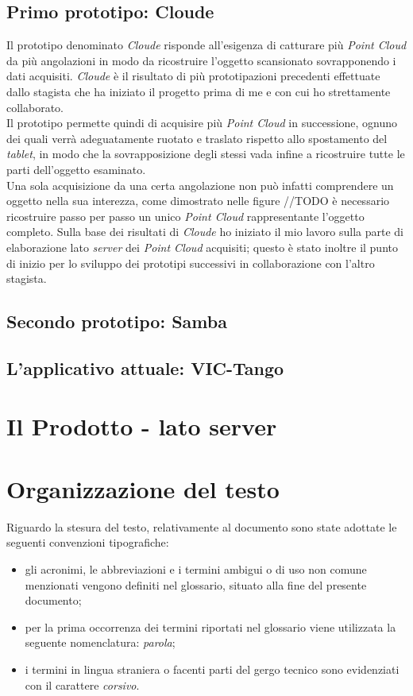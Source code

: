 \subsection{Primo prototipo: Cloude}
Il prototipo denominato \emph{Cloude} risponde all'esigenza di catturare più \emph{Point Cloud} da più angolazioni in modo da ricostruire l'oggetto scansionato sovrapponendo i dati acquisiti. \emph{Cloude} è il risultato di più prototipazioni precedenti effettuate dallo stagista che ha iniziato il progetto prima di me e con cui ho strettamente collaborato.\\
Il prototipo permette quindi di acquisire più \emph{Point Cloud} in successione, ognuno dei quali verrà adeguatamente ruotato e traslato rispetto allo spostamento del \emph{tablet}, in modo che la sovrapposizione degli stessi vada infine a ricostruire tutte le parti dell'oggetto esaminato.\\
Una sola acquisizione da una certa angolazione non può infatti comprendere un oggetto nella sua interezza, come dimostrato nelle figure //TODO è necessario ricostruire passo per passo un unico \emph{Point Cloud} rappresentante l'oggetto completo.
Sulla base dei risultati di \emph{Cloude} ho iniziato il mio lavoro sulla parte di elaborazione lato \emph{server} dei \emph{Point Cloud} acquisiti; questo è stato inoltre il punto di inizio per lo sviluppo dei prototipi successivi in collaborazione con l'altro stagista.

\subsection{Secondo prototipo: Samba}


\subsection{L'applicativo attuale: VIC-Tango}

\section{Il Prodotto - lato server}



\section{Organizzazione del testo}
Riguardo la stesura del testo, relativamente al documento sono state adottate le seguenti convenzioni tipografiche:
\begin{itemize}
	\item gli acronimi, le abbreviazioni e i termini ambigui o di uso non comune menzionati vengono definiti nel glossario, situato alla fine del presente documento;
	\item per la prima occorrenza dei termini riportati nel glossario viene utilizzata la seguente nomenclatura: \emph{parola}\glsfirstoccur;
	\item i termini in lingua straniera o facenti parti del gergo tecnico sono evidenziati con il carattere \emph{corsivo}.
\end{itemize}